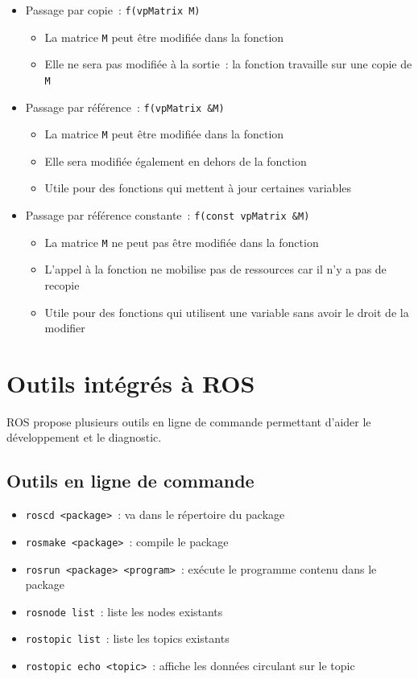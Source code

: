 \documentclass[12pt,a4paper]{article}
\begin{document}
\begin{itemize}
\item Passage par copie~: \texttt{f(vpMatrix M)}
\begin{itemize}
\item La matrice \texttt{M} peut être modifiée dans la fonction
\item Elle ne sera pas modifiée à la sortie~: la fonction travaille sur une copie de \texttt{M}
\end{itemize}
\item Passage par référence~: \texttt{f(vpMatrix \&M)}
\begin{itemize}
\item La matrice \texttt{M} peut être modifiée dans la fonction
\item Elle sera modifiée également en dehors de la fonction
\item Utile pour des fonctions qui mettent à jour certaines variables
\end{itemize}
\item Passage par référence constante~: \texttt{f(const vpMatrix \&M)}
\begin{itemize}
\item La matrice \texttt{M} ne peut pas être modifiée dans la fonction
\item L'appel à la fonction ne mobilise pas de ressources car il n'y a pas de recopie
\item Utile pour des fonctions qui utilisent une variable sans avoir le droit de la modifier
\end{itemize}
\end{itemize}



\section{Outils intégrés à ROS}
\label{sec:lignecomm}

ROS propose plusieurs outils en ligne de commande permettant d'aider le développement et le diagnostic.
\subsection{Outils en ligne de commande}
\begin{itemize}
\item \texttt{roscd <package>}~: va dans le répertoire du package
\item \texttt{rosmake <package>}~: compile le package
\item \texttt{rosrun <package> <program>}~: exécute le programme contenu dans le package 
\item \texttt{rosnode list}~: liste les nodes existants
\item \texttt{rostopic list}~: liste les topics existants
\item \texttt{rostopic echo <topic>}~: affiche les données circulant sur le topic
\end{itemize}
\end{document}
